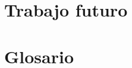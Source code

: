 \documentclass[a4paper, 11pt]{book}
\begin{document}
\chapter{Trabajo futuro}


\chapter{Glosario}






% 


% 


% 



% 
\end{document}
